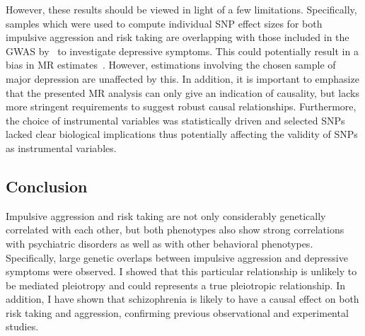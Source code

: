 However, these results should be viewed in light of a few limitations.
Specifically, samples which were used to compute individual SNP effect sizes for both impulsive aggression and risk taking are overlapping with those included in the GWAS by~\cite{Okbay2016} to investigate depressive symptoms.
This could potentially result in a bias in MR estimates~\cite{Burgess2016c}.
However, estimations involving the chosen sample of major depression are unaffected by this.
In addition, it is important to emphasize that the  presented MR analysis can only give an indication of causality, but lacks more stringent requirements to suggest robust causal relationships.
Furthermore, the choice of instrumental variables was statistically driven and selected SNPs lacked  clear biological implications thus potentially affecting the validity of SNPs as instrumental variables.

\subsection{Conclusion}
\label{sub:conclusion_psych}

Impulsive aggression and risk taking are not only considerably genetically correlated with  each other, but both phenotypes also show strong correlations with psychiatric disorders as well as with other behavioral phenotypes.
Specifically, large genetic overlaps between impulsive aggression and depressive symptoms were observed.
I showed that this particular relationship is unlikely to be mediated pleiotropy and could represents a true pleiotropic relationship.
In addition, I have shown that schizophrenia is likely to have a causal effect on both risk taking and aggression,
confirming previous observational and experimental studies.

